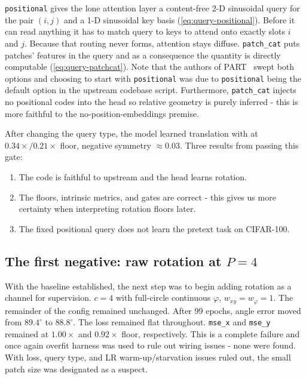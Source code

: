 \documentclass[final_report.tex]{subfiles}
\begin{document}
\texttt{positional} gives the lone attention layer a content-free 2-D sinusoidal query for the pair $(i,j)$ and a 1-D sinusoidal key basis (\cref{eq:query-positional}). Before it can read anything it has to match query to keys to attend onto exactly slots $i$ and $j$. Because that routing never forms, attention stays diffuse. \texttt{patch\_cat} puts patches' features in the query and as a consequence the quantity is directly computable (\cref{eq:query-patchcat}). Note that the authors of PART~\cite{part} swept both options and choosing to start with \texttt{positional} was due to \texttt{positional} being the default option in the upstream codebase script. Furthermore, \texttt{patch\_cat} injects no positional codes into the head so relative geometry is purely inferred - this is more faithful to the no-position-embeddings premise.

After changing the query type, the model learned translation with  at $0.34\times / 0.21\times$ floor, negative symmetry $\approx 0.03$. Three results from passing this gate:
\begin{enumerate}
\item The code is faithful to upstream and the head learns rotation.
\item The floors, intrinsic metrics, and gates are correct - this gives us more certainty when interpreting rotation floors later.
\item The fixed positional query does not learn the pretext task on CIFAR-100.
\end{enumerate}


\subsection{The first negative: raw rotation at \texorpdfstring{$P=4$}{P=4}}\label{sec:first-negative}
With the baseline established, the next step was to begin adding rotation as a channel for supervision. $c=4$ with full-circle continuous 
$\varphi$, $w_{xy}=w_\varphi=1$. The remainder of the config remained unchanged. After 99 epochs, angle error moved from $89.4^\circ$ to $88.8^\circ$. The loss remained flat throughout. \texttt{mse\_x} and \texttt{mse\_y} remained at $1.00\times$ and $0.92\times$ floor, respectively. This is a complete failure and once again overfit harness was used to rule out wiring issues - none were found. With loss, query type, and LR warm-up/starvation issues ruled out, the small patch size was designated as a suspect.
\end{document}
